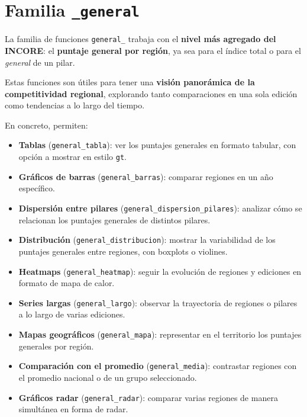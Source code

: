 \documentclass[
  11pt,
  letterpaper,
  DIV=11,
  numbers=noendperiod]{scrartcl}
\providecommand{\tightlist}{%
  \setlength{\itemsep}{0pt}\setlength{\parskip}{0pt}}\usepackage{longtable,booktabs,array}
\begin{document}
\section{\texorpdfstring{Familia
\texttt{\_general}}{Familia \_general}}\label{familia-_general}

La familia de funciones \texttt{general\_} trabaja con el \textbf{nivel
más agregado del INCORE}: el \textbf{puntaje general por región}, ya sea
para el índice total o para el \emph{general} de un pilar.

Estas funciones son útiles para tener una \textbf{visión panorámica de
la competitividad regional}, explorando tanto comparaciones en una sola
edición como tendencias a lo largo del tiempo.

En concreto, permiten:

\begin{itemize}
\tightlist
\item
  \textbf{Tablas} (\texttt{general\_tabla}): ver los puntajes generales
  en formato tabular, con opción a mostrar en estilo \texttt{gt}.\\
\item
  \textbf{Gráficos de barras} (\texttt{general\_barras}): comparar
  regiones en un año específico.\\
\item
  \textbf{Dispersión entre pilares}
  (\texttt{general\_dispersion\_pilares}): analizar cómo se relacionan
  los puntajes generales de distintos pilares.\\
\item
  \textbf{Distribución} (\texttt{general\_distribucion}): mostrar la
  variabilidad de los puntajes generales entre regiones, con boxplots o
  violines.\\
\item
  \textbf{Heatmaps} (\texttt{general\_heatmap}): seguir la evolución de
  regiones y ediciones en formato de mapa de calor.\\
\item
  \textbf{Series largas} (\texttt{general\_largo}): observar la
  trayectoria de regiones o pilares a lo largo de varias ediciones.\\
\item
  \textbf{Mapas geográficos} (\texttt{general\_mapa}): representar en el
  territorio los puntajes generales por región.\\
\item
  \textbf{Comparación con el promedio} (\texttt{general\_media}):
  contrastar regiones con el promedio nacional o de un grupo
  seleccionado.\\
\item
  \textbf{Gráficos radar} (\texttt{general\_radar}): comparar varias
  regiones de manera simultánea en forma de radar.
\end{itemize}
\end{document}
